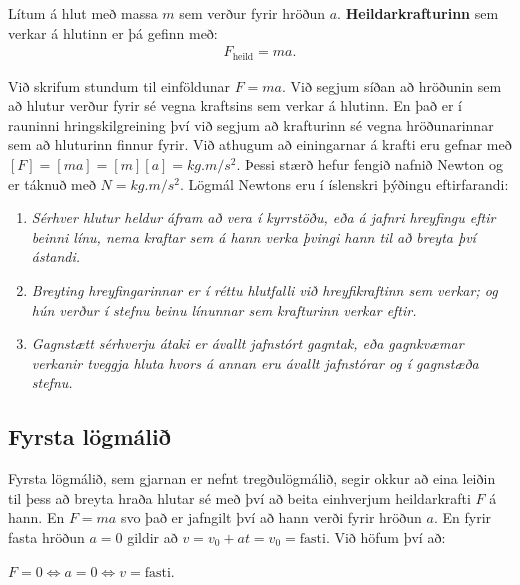 \ifdefined \wholebook \else\documentclass[oneside]{book}\usepackage{EdlBook}\graphicspath{{figures/}}
\begin{document}
\begin{tcolorbox}
\begin{definition}
Lítum á hlut með massa $m$ sem verður fyrir hröðun $a$. \textbf{Heildarkrafturinn} sem verkar á hlutinn er þá gefinn með:
\begin{align*}
    F_{\text{heild}} = ma.
\end{align*}
\end{definition}
\end{tcolorbox}

Við skrifum stundum til einföldunar $F = ma$. Við segjum síðan að hröðunin sem að hlutur verður fyrir sé vegna kraftsins sem verkar á hlutinn. En það er í rauninni hringskilgreining því við segjum að krafturinn sé vegna hröðunarinnar sem að hluturinn finnur fyrir. Við athugum að einingarnar á krafti eru gefnar með $[F] = [ma] = [m][a] = \si{kg.m/s^2}$.
Þessi stærð hefur fengið nafnið Newton og er táknuð með $\si{N} = \si{kg.m/s^2}$. Lögmál Newtons eru í íslenskri þýðingu eftirfarandi:

\begin{tcolorbox}[left=1.8cm]
\begin{enumerate}[label = \textbf{Lögmál \arabic*} \hspace{0.25cm}]
    \item \textit{Sérhver hlutur heldur áfram að vera í kyrrstöðu, eða á jafnri hreyfingu eftir beinni línu, nema kraftar sem á hann verka þvingi hann til að breyta því ástandi.}
    
    \item \textit{Breyting hreyfingarinnar er í réttu hlutfalli við hreyfikraftinn sem verkar; og hún verður í stefnu beinu línunnar sem krafturinn verkar eftir.} 
    
    \item \textit{Gagnstætt sérhverju átaki er ávallt jafnstórt gagntak, eða gagnkvæmar verkanir tveggja hluta hvors á annan eru ávallt jafnstórar og í gagnstæða stefnu.}
\end{enumerate}
\end{tcolorbox}
\subsection*{Fyrsta lögmálið}

Fyrsta lögmálið, sem gjarnan er nefnt tregðulögmálið, segir okkur að eina leiðin til þess að breyta hraða hlutar sé með því að beita einhverjum heildarkrafti $F$ á hann. En $F = ma$ svo það er jafngilt því að hann verði fyrir hröðun $a$. En fyrir fasta hröðun $a = 0$ gildir að $v = v_0 + at = v_0 = \text{fasti}$. Við höfum því að:
\begin{center}
\begin{tcbox}[nobeforeafter]{$F = 0 \iff a = 0 \iff v = \text{fasti}.$}
\end{tcbox}
\end{center}
\end{document}
